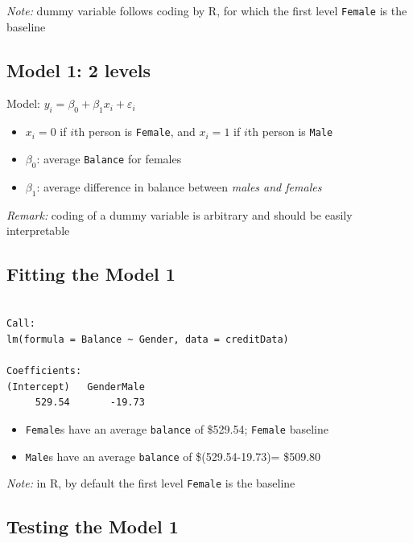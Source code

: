 \documentclass[]{article}
\providecommand{\tightlist}{%
  \setlength{\itemsep}{0pt}\setlength{\parskip}{0pt}}
\begin{document}
\emph{Note:} dummy variable follows coding by R, for which the first
level \texttt{Female} is the baseline

\subsection{Model 1: 2 levels}\label{model-1-2-levels-1}

Model: \(y_i = \beta_0 + \beta_1 x_i + \varepsilon_i\)

\begin{itemize}
\tightlist
\item
  \(x_i =0\) if \(i\)th person is \texttt{Female}, and \(x_i =1\) if
  \(i\)th person is \texttt{Male}
\item
  \(\beta_0\): average \texttt{Balance} for females
\item
  \(\beta_1\): average difference in balance between \emph{males and
  females}
\end{itemize}

\emph{Remark:} coding of a dummy variable is arbitrary and should be
easily interpretable

\subsection{Fitting the Model 1}\label{fitting-the-model-1}

\begin{verbatim}

Call:
lm(formula = Balance ~ Gender, data = creditData)

Coefficients:
(Intercept)   GenderMale  
     529.54       -19.73  
\end{verbatim}

\begin{itemize}
\tightlist
\item
  \texttt{Female}s have an average \texttt{balance} of \$529.54;
  \texttt{Female} baseline
\item
  \texttt{Male}s have an average \texttt{balance} of \$(529.54-19.73)=
  \$509.80
\end{itemize}

\emph{Note:} in R, by default the first level \texttt{Female} is the
baseline

\subsection{Testing the Model 1}\label{testing-the-model-1}
\end{document}
